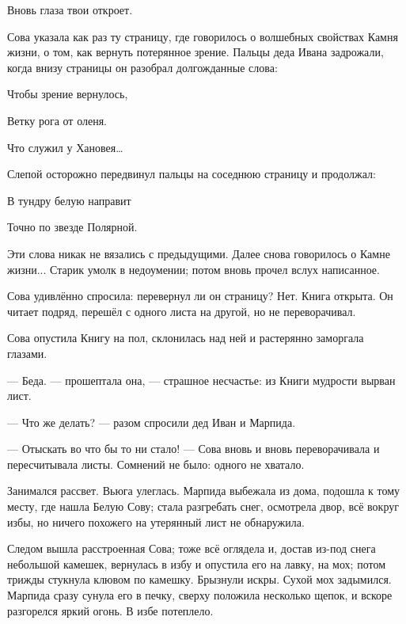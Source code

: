 \documentclass[12pt, a4paper, openany]{book}
\begin{document}
\qquad \qquad \qquad 	Вновь глаза твои откроет.
	
	
	
	
	Сова указала как раз ту страницу, где говорилось о волшебных свойствах Камня жизни, о том, как вернуть потерянное зрение. Пальцы деда Ивана задрожали, когда внизу страницы он разобрал долгожданные слова: 
	
	
	
	
\qquad \qquad \qquad 	Чтобы зрение вернулось,
	
\qquad \qquad \qquad 	Ветку рога от оленя.
	
\qquad \qquad \qquad 	Что служил у Хановея…
	
	
	
	
	Слепой осторожно передвинул пальцы на соседнюю страницу и продолжал:
	
	
	
	
\qquad \qquad \qquad 	В тундру белую направит
	
\qquad \qquad \qquad 	Точно по звезде Полярной.
	
	
	
	
	Эти слова никак не вязались с предыдущими. Далее снова говорилось о Камне жизни... Старик умолк в недоумении; потом вновь прочел вслух написанное.
	
	Сова удивлённо спросила: перевернул ли он страницу? Нет. Книга открыта. Он читает подряд, перешёл с одного листа на другой, но не переворачивал.
	
	Сова опустила Книгу на пол, склонилась над ней и растерянно заморгала глазами.
	
	— Беда. — прошептала она, — страшное несчастье: из Книги мудрости вырван лист.
	
	— Что же делать? — разом спросили дед Иван и Марпида.
	
	— Отыскать во что бы то ни стало! — Сова вновь и вновь переворачивала и пересчитывала листы. Сомнений не было: одного не хватало.
	
	Занимался рассвет. Вьюга улеглась. Марпида выбежала из дома, подошла к тому месту, где нашла Белую Сову; стала разгребать снег, осмотрела двор, всё вокруг избы, но ничего похожего на утерянный лист не обнаружила.
	
	Следом вышла расстроенная Сова; тоже всё оглядела и, достав из-под снега небольшой камешек, вернулась в избу и опустила его на лавку, на мох; потом трижды стукнула клювом по камешку. Брызнули искры. Сухой мох задымился. Марпида сразу сунула его в печку, сверху положила несколько щепок, и вскоре разгорелся яркий огонь. В избе потеплело.
	
\end{document}
